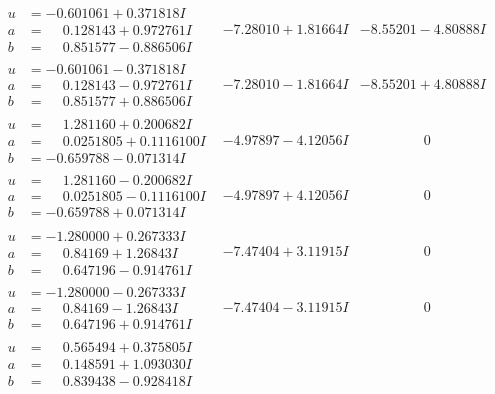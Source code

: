 \documentclass[1p]{elsarticle_modified}
\theoremstyle{definition}
\begin{document}
$$\begin{array}{c|c|c}
\begin{aligned}
u &= -0.601061 + 0.371818 I \\
a &= \phantom{-}0.128143 + 0.972761 I \\
b &= \phantom{-}0.851577 - 0.886506 I\end{aligned}
 & -7.28010 + 1.81664 I & -8.55201 - 4.80888 I \\ \hline\begin{aligned}
u &= -0.601061 - 0.371818 I \\
a &= \phantom{-}0.128143 - 0.972761 I \\
b &= \phantom{-}0.851577 + 0.886506 I\end{aligned}
 & -7.28010 - 1.81664 I & -8.55201 + 4.80888 I \\ \hline\begin{aligned}
u &= \phantom{-}1.281160 + 0.200682 I \\
a &= \phantom{-}0.0251805 + 0.1116100 I \\
b &= -0.659788 - 0.071314 I\end{aligned}
 & -4.97897 - 4.12056 I & \phantom{-0.000000 } 0 \\ \hline\begin{aligned}
u &= \phantom{-}1.281160 - 0.200682 I \\
a &= \phantom{-}0.0251805 - 0.1116100 I \\
b &= -0.659788 + 0.071314 I\end{aligned}
 & -4.97897 + 4.12056 I & \phantom{-0.000000 } 0 \\ \hline\begin{aligned}
u &= -1.280000 + 0.267333 I \\
a &= \phantom{-}0.84169 + 1.26843 I \\
b &= \phantom{-}0.647196 - 0.914761 I\end{aligned}
 & -7.47404 + 3.11915 I & \phantom{-0.000000 } 0 \\ \hline\begin{aligned}
u &= -1.280000 - 0.267333 I \\
a &= \phantom{-}0.84169 - 1.26843 I \\
b &= \phantom{-}0.647196 + 0.914761 I\end{aligned}
 & -7.47404 - 3.11915 I & \phantom{-0.000000 } 0 \\ \hline\begin{aligned}
u &= \phantom{-}0.565494 + 0.375805 I \\
a &= \phantom{-}0.148591 + 1.093030 I \\
b &= \phantom{-}0.839438 - 0.928418 I\end{aligned}

\end{array}$$
\end{document}
